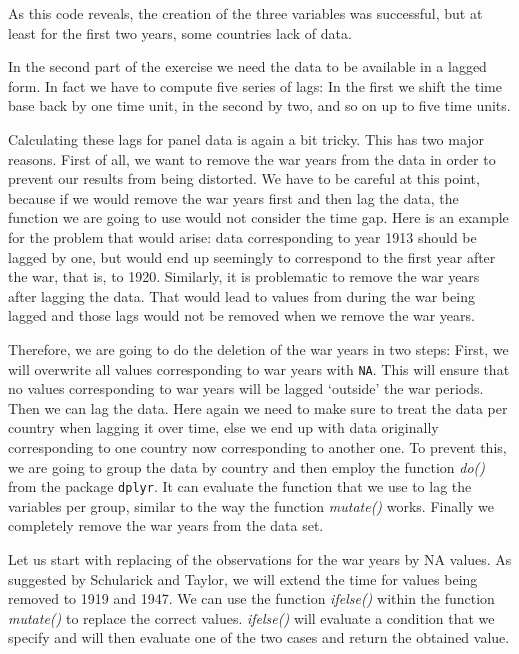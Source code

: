 \documentclass[a4paper,11pt,abstract=on]{scrartcl}
\newenvironment{infobox2}{}{}
\begin{document}
{\begin{infobox2}
As this code reveals, the creation of the three variables was
successful, but at least for the first two years, some countries lack of
data.
\end{infobox2}

In the second part of the exercise we need the data to be available in a
lagged form. In fact we have to compute five series of lags: In the
first we shift the time base back by one time unit, in the second by
two, and so on up to five time units.

Calculating these lags for panel data is again a bit tricky. This has
two major reasons. First of all, we want to remove the war years from
the data in order to prevent our results from being distorted. We have
to be careful at this point, because if we would remove the war years
first and then lag the data, the function we are going to use would not
consider the time gap. Here is an example for the problem that would
arise: data corresponding to year 1913 should be lagged by one, but
would end up seemingly to correspond to the first year after the war,
that is, to 1920. Similarly, it is problematic to remove the war years
after lagging the data. That would lead to values from during the war
being lagged and those lags would not be removed when we remove the war
years.

Therefore, we are going to do the deletion of the war years in two
steps: First, we will overwrite all values corresponding to war years
with \texttt{NA}. This will ensure that no values corresponding to war
years will be lagged `outside' the war periods. Then we can lag the
data. Here again we need to make sure to treat the data per country when
lagging it over time, else we end up with data originally corresponding
to one country now corresponding to another one. To prevent this, we are
going to group the data by country and then employ the function
\emph{do()} from the package \texttt{dplyr}. It can evaluate the
function that we use to lag the variables per group, similar to the way
the function \emph{mutate()} works. Finally we completely remove the war
years from the data set.

Let us start with replacing of the observations for the war years by NA
values. As suggested by Schularick and Taylor, we will extend the time
for values being removed to 1919 and 1947. We can use the function
\emph{ifelse()} within the function \emph{mutate()} to replace the
correct values. \emph{ifelse()} will evaluate a condition that we
specify and will then evaluate one of the two cases and return the
obtained value.

}
\end{document}
